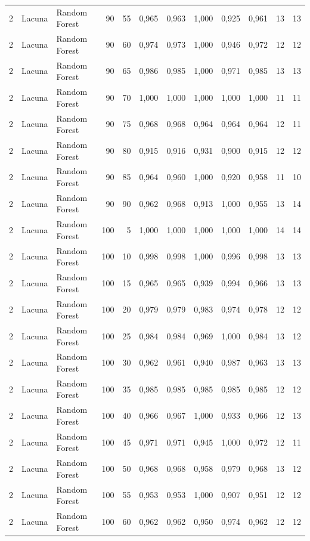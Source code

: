 \begin{longtable}{@{}rllrrrrrrrrr@{}}
2 & Lacuna & Random Forest & 90 & 55 & 0,965 & 0,963 & 1,000 & 0,925 & 0,961 & 13 & 13 \\
2 & Lacuna & Random Forest & 90 & 60 & 0,974 & 0,973 & 1,000 & 0,946 & 0,972 & 12 & 12 \\
2 & Lacuna & Random Forest & 90 & 65 & 0,986 & 0,985 & 1,000 & 0,971 & 0,985 & 13 & 13 \\
2 & Lacuna & Random Forest & 90 & 70 & 1,000 & 1,000 & 1,000 & 1,000 & 1,000 & 11 & 11 \\
2 & Lacuna & Random Forest & 90 & 75 & 0,968 & 0,968 & 0,964 & 0,964 & 0,964 & 12 & 11 \\
2 & Lacuna & Random Forest & 90 & 80 & 0,915 & 0,916 & 0,931 & 0,900 & 0,915 & 12 & 12 \\
2 & Lacuna & Random Forest & 90 & 85 & 0,964 & 0,960 & 1,000 & 0,920 & 0,958 & 11 & 10 \\
2 & Lacuna & Random Forest & 90 & 90 & 0,962 & 0,968 & 0,913 & 1,000 & 0,955 & 13 & 14 \\
2 & Lacuna & Random Forest & 100 & 5 & 1,000 & 1,000 & 1,000 & 1,000 & 1,000 & 14 & 14 \\
2 & Lacuna & Random Forest & 100 & 10 & 0,998 & 0,998 & 1,000 & 0,996 & 0,998 & 13 & 13 \\
2 & Lacuna & Random Forest & 100 & 15 & 0,965 & 0,965 & 0,939 & 0,994 & 0,966 & 13 & 13 \\
2 & Lacuna & Random Forest & 100 & 20 & 0,979 & 0,979 & 0,983 & 0,974 & 0,978 & 12 & 12 \\
2 & Lacuna & Random Forest & 100 & 25 & 0,984 & 0,984 & 0,969 & 1,000 & 0,984 & 13 & 12 \\
2 & Lacuna & Random Forest & 100 & 30 & 0,962 & 0,961 & 0,940 & 0,987 & 0,963 & 13 & 13 \\
2 & Lacuna & Random Forest & 100 & 35 & 0,985 & 0,985 & 0,985 & 0,985 & 0,985 & 12 & 12 \\
2 & Lacuna & Random Forest & 100 & 40 & 0,966 & 0,967 & 1,000 & 0,933 & 0,966 & 12 & 13 \\
2 & Lacuna & Random Forest & 100 & 45 & 0,971 & 0,971 & 0,945 & 1,000 & 0,972 & 12 & 11 \\
2 & Lacuna & Random Forest & 100 & 50 & 0,968 & 0,968 & 0,958 & 0,979 & 0,968 & 13 & 12 \\
2 & Lacuna & Random Forest & 100 & 55 & 0,953 & 0,953 & 1,000 & 0,907 & 0,951 & 12 & 12 \\
2 & Lacuna & Random Forest & 100 & 60 & 0,962 & 0,962 & 0,950 & 0,974 & 0,962 & 12 & 12 \\

\end{longtable}
